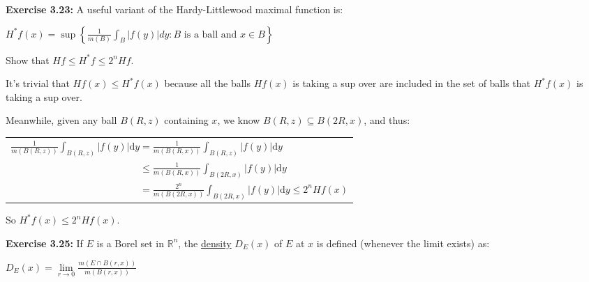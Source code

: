 \documentclass{book}
\newcommand{\exTwoP}{%
   \color{RedViolet}%
   \fontsize{13}{15}\selectfont%
}
\newenvironment{myIndent}{%
   \begin{adjustwidth}{2.5em}{0em}%
}{%
   \end{adjustwidth}%
}
\newcommand{\udefine}[1]{{%
   \setulcolor{Red}%
   \setul{0.14em}{0.07em}%
   \ul{#1}%
}}
\newcommand{\blab}[1]{\textbf{#1}}
\newcommand{\df}{\mathrm{d}}
\newcommand{\retTwo}{\hfill\bigbreak}
\begin{document}
\blab{Exercise 3.23:} A useful variant of the Hardy-Littlewood maximal function is:

{\centering $H^*f(x) = \sup\left\{\frac{1}{m(B)}\int_B |f(y)|dy : B \text{ is a ball and } x \in B\right\}$ \retTwo\par}

Show that $Hf \leq H^*f \leq 2^n Hf$.

\begin{myIndent}\exTwoP
	It's trivial that $Hf(x) \leq H^*f(x)$ because all the balls $Hf(x)$ is taking a sup over are included in the set of balls that $H^*f(x)$ is taking a sup over.\retTwo

	Meanwhile, given any ball $B(R, z)$ containing $x$, we know $B(R, z)\subseteq B(2R, x)$, and thus:

	{\centering\begin{tabular}{l}
		$ \frac{1}{m(B(R, z))}\int_{B(R, z)}|f(y)|\df y = \frac{1}{m(B(R, x))}\int_{B(R, z)}|f(y)|\df y $\\ [8pt]
		$\phantom{ \frac{1}{m(B(R, z))}\int_{B(R, z)}|f(y)|\df y} \leq \frac{1}{m(B(R, x))}\int_{B(2R, x)}|f(y)|\df y $
		\\ [8pt]
		$\phantom{ \frac{1}{m(B(R, z))}\int_{B(R, z)}|f(y)|\df y} = \frac{2^n}{m(B(2R, x))}\int_{B(2R, x)}|f(y)|\df y \leq 2^n Hf(x)$
	\end{tabular}\retTwo\par}

	So $H^*f(x) \leq 2^nHf(x)$.\retTwo
\end{myIndent}

\blab{Exercise 3.25:} If $E$ is a Borel set in $\mathbb{R}^n$, the \udefine{density} $D_E(x)$ of $E$ at $x$ is defined (whenever the limit exists) as:

{\centering $D_E(x) = \lim\limits_{r \rightarrow 0} \frac{m(E \cap B(r, x))}{m(B(r, x))}$\par}
\end{document}
